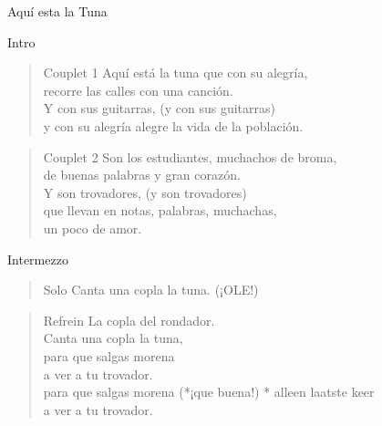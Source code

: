 \begin{song}{Aquí esta la Tuna}
\begin{instrumental}{Intro}
  \measure{} 
 \measure{} \measure{} 
 \measure{} \measure{} 
 \measure{} \measure{}   \measure{} 
\end{instrumental}

\begin{verse}{Couplet 1}
Aqu\'{i} est\'{a} la tuna que con su alegría,\\
recorre las calles con una canción.\\
\chord{}Y con sus guitarras, (y con sus guitarras)\\
y con su alegr\'{i}a alegre la vida de la población.
\end{verse}

\begin{verse}{Couplet 2}
Son los estudiantes, muchachos de broma,\\
de buenas palabras y gran corazón.\\
\chord{}Y son trovadores, (y son trovadores)\\
\chord{}que llevan en notas, palabras, muchachas,\\
un poco de amor.\hspace{1em} \hspace{2em}
\end{verse}

\begin{instrumental}{Intermezzo}
  \measure{} 
 \measure{} \measure{} 
 \measure{} \measure{} 
\end{instrumental}

\begin{verse}{Solo}
Canta una copla la tuna. (¡OLE!)
\end{verse}
\begin{verse}{Refrein}
\hspace{1em}La copla del rondador.\\
Canta una copla la tuna,\\
para que salgas morena\\
a ver a tu trovador.\\
para que salgas morena (*¡que buena!)\hspace{2em} * alleen laatste keer\\
a ver a tu trovador.\hspace{1em}
\end{verse}


\end{song}
